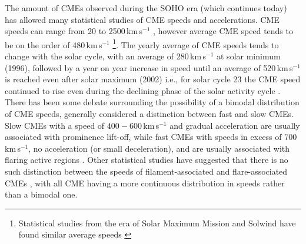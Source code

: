 The amount of CMEs observed during the SOHO era (which continues today) has allowed many statistical studies of CME speeds and accelerations. CME speeds can range from 20 to 2500\,km\,s$^{-1}$ \citep{gopal2004}, however average CME speed tends to be on the order of 480\,km\,s$^{-1}$ \citep{yurch2005, webb2012}\footnote{Statistical studies from the era of Solar Maximum Mission and Solwind have found similar average speeds \citep{burk2004}}. The yearly average of CME speeds tends to change with the solar cycle, with an average of 280\,km\,s$^{-1}$ at solar minimum (1996), followed by a year on year increase in speed until an average of 520\,km\,s$^{-1}$ is reached even after solar maximum (2002) i.e., for solar cycle 23 the CME speed continued to rise even during the declining phase of the solar activity cycle \citep{yashiro2004}. There has been some debate surrounding the possibility of a bimodal distribution of CME speeds, generally considered a distinction between fast and slow CMEs. Slow CMEs with a speed of $400-600$\,km\,s$^{-1}$ and gradual acceleration are usually associated with prominence lift-off, while fast CMEs with speeds in excess of 700\,km\,s$^{-1}$, no acceleration (or small deceleration), and are usually associated with flaring active regions \citep{shee1999, gopal2004, moon2000}. Other statistical studies have suggested that there is no such distinction between the speeds of filament-associated and flare-associated CMEs \citep{vrsna2005, yurch2005}, with all CME having a more continuous distribution in speeds rather than a bimodal one. 

